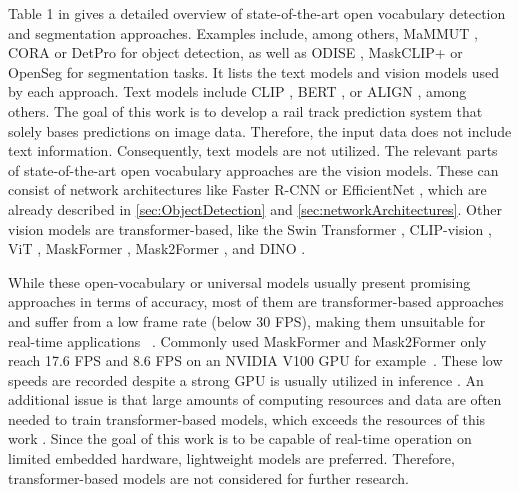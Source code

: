 Table 1 in \cite{openvocabularysurvey2024} gives a detailed overview of state-of-the-art open vocabulary detection and segmentation approaches.
Examples include, among others, MaMMUT \cite{MaMMUT2023}, CORA \cite{CORA2023} or DetPro \cite{detPro2022} for object detection, as well as ODISE \cite{ODISE2023}, MaskCLIP+ \cite{MaskCLIP2022} or OpenSeg \cite{OpenSeg2022} for segmentation tasks.
It lists the text models and vision models used by each approach.
Text models include CLIP \cite{CLIP2021}, BERT \cite{BERT2019}, or ALIGN \cite{ALIGN2021}, among others.
The goal of this work is to develop a rail track prediction system that solely bases predictions on image data.
Therefore, the input data does not include text information.
Consequently, text models are not utilized.
The relevant parts of state-of-the-art open vocabulary approaches are the vision models.
These can consist of network architectures like Faster R-CNN or EfficientNet \cite{openvocabularysurvey2024}, which are already described in \autoref{sec:ObjectDetection} and \autoref{sec:networkArchitectures}.
Other vision models are transformer-based, like the Swin Transformer \cite{swinTransformer2021}, CLIP-vision \cite{CLIP2021}, ViT \cite{ViT2021}, MaskFormer \cite{MaskFormer2021}, Mask2Former \cite{mask2Former2022}, and DINO \cite{DINO2022}.

While these open-vocabulary or universal models usually present promising approaches in terms of accuracy, most of them are transformer-based approaches and suffer from a low frame rate (below 30 \ac{FPS}), making them unsuitable for real-time applications \cite{carion2020endtoendobjectdetectiontransformers} \cite{groundingdino2024} \cite{swinTransformer2021} \cite{MaskFormer2021} \cite{mask2Former2022}~\cite{glipv22022}.
Commonly used MaskFormer and Mask2Former only reach 17.6 \ac{FPS} and 8.6 \ac{FPS} on an NVIDIA V100 GPU for example~\cite{mask2Former2022}.
These low speeds are recorded despite a strong GPU is usually utilized in inference \cite{groundingdino2024} \cite{glipv22022}.
An additional issue is that large amounts of computing resources and data are often needed to train transformer-based models, which exceeds the resources of this work \cite{groundingdino2024} \cite{glipv22022} \cite{segmentAnything2023} \cite{segmentAnything22024}.
Since the goal of this work is to be capable of real-time operation on limited embedded hardware, lightweight models are preferred.
Therefore, transformer-based models are not considered for further research.